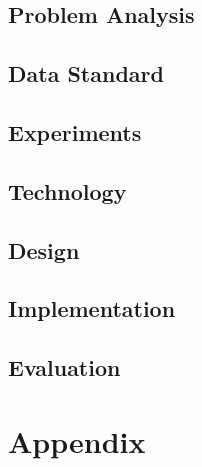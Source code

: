 \chapter{Problem Analysis}




%
%



%
%


\chapter{Data Standard}


\chapter{Experiments}


\chapter{Technology}


\chapter{Design}

\chapter{Implementation}

\chapter{Evaluation}

\newpage
\listoftodos
\newpage

\renewcommand{\glsgroupskip}{}
\printglossaries


\printbibliography

\part{Appendix}
\appendix



